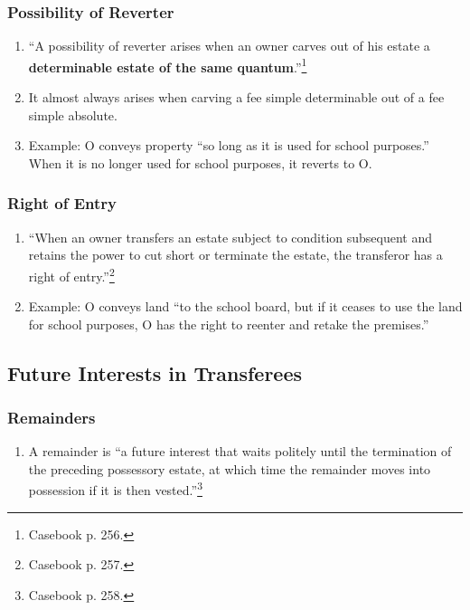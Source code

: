 \subsubsection{Possibility of Reverter}

\begin{enumerate}
    \item ``A possibility of reverter arises when an owner carves out of his 
    estate a \textbf{determinable estate of the same 
    quantum}.''\footnote{Casebook p. 256.}
    \item It almost always arises when carving a fee simple determinable out 
    of a fee simple absolute.
    \item Example: O conveys property ``so long as it is used for school 
    purposes.'' When it is no longer used for school purposes, it reverts to 
    O.
\end{enumerate}

\subsubsection{Right of Entry}

\begin{enumerate}
    \item ``When an owner transfers an estate subject to condition subsequent 
    and retains the power to cut short or terminate the estate, the transferor 
    has a right of entry.''\footnote{Casebook p. 257.}
    \item Example: O conveys land ``to the school board, but if it ceases to 
    use the land for school purposes, O has the right to reenter and retake 
    the premises.''
\end{enumerate}

\subsection{Future Interests in Transferees}

\subsubsection{Remainders}

\begin{enumerate}
    \item A remainder is ``a future interest that waits politely until the 
    termination of the preceding possessory estate, at which time the 
    remainder moves into possession if it is then vested.''\footnote{Casebook 
    p. 258.}
\end{enumerate}

